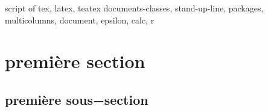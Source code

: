 \documentclass [twoside,a4,a4paper]{article}
\begin{document}
\maketitle script of tex, latex, teatex
\tableofcontents documents-classes, stand-up-line, packages, multicolumns, document, epsilon, calc, r
\section{première section}
\subsection{première sous−section}
\end{document}
